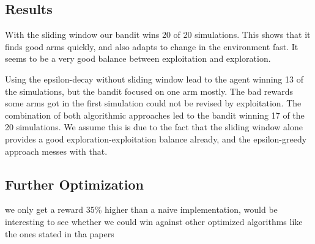 \documentclass[10pt]{article}
\begin{document}
\subsection{Results}\label{subsec:mab-results}
With the sliding window our bandit wins 20 of 20 simulations.
This shows that it finds good arms quickly, and also adapts to change in the environment fast.
It seems to be a very good balance between exploitation and exploration.

Using the epsilon-decay without sliding window lead to the agent winning 13 of the simulations, but the bandit focused on one arm mostly.
The bad rewards some arms got in the first simulation could not be revised by exploitation.
The combination of both algorithmic approaches led to the bandit winning 17 of the 20 simulations.
We assume this is due to the fact that the sliding window alone provides a good exploration-exploitation balance already, and the epsilon-greedy approach messes with that.


\subsection{Further Optimization}\label{subsec:mab-further-optimization}
we only get a reward 35\% higher than a naive implementation, would be interesting to see whether we could win against other optimized algorithms like the ones stated in tha papers
\end{document}
